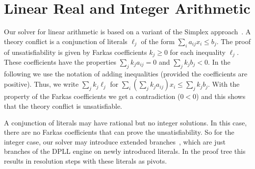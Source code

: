 \section{Linear Real and Integer Arithmetic}

Our solver for linear arithmetic is based on a variant of the Simplex
approach~\cite{Dutertre2006}.  A theory conflict is a conjunction of
literals $\ell_j$ of the form $\sum_i a_{ij} x_{i} \leq b_j$.  The
proof of unsatisfiability is given by Farkas coefficients $k_j\geq 0$
for each inequality $\ell_j$.  These coefficients have the properties
$\sum_j k_ja_{ij} = 0$ and $\sum_j k_jb_j < 0$.  In the following we
use the notation of adding inequalities (provided the coefficients are
positive).  Thus, we write $\sum_j k_j \ell_j$ for $\sum_i (\sum_j k_j
a_{ij}) x_i \leq \sum_j k_jb_j$. With the property of the Farkas
coefficients we get a contradiction ($0<0$) and this shows that the theory
conflict is unsatisfiable.

A conjunction of literals may have rational but no integer solutions.
In this case, there are no Farkas coefficients that can prove the
unsatisfiability.  So for the integer case, our solver may introduce
extended branches~\cite{Dillig2011}, which are just branches of the DPLL engine
on newly introduced literals.  In the proof tree this results in resolution
steps with these literals as pivots.








